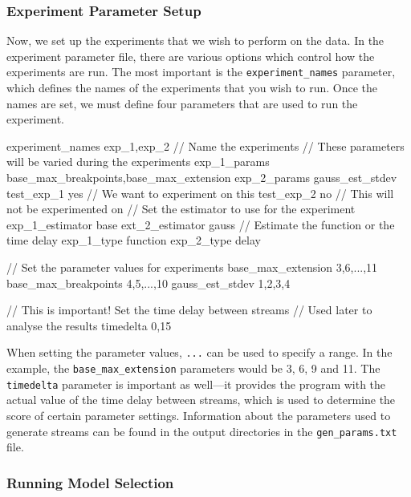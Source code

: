 \documentclass[a4paper,11pt,twoside]{article}
\begin{document}
\begin{appendices}
\subsubsection{Experiment Parameter Setup}
\label{sec-10-3-3}

    Now, we set up the experiments that we wish to perform on the data. In the
    experiment parameter file, there are various options which control how the
    experiments are run. The most important is the \texttt{experiment\_names}
    parameter, which defines the names of the experiments that you wish to run. Once
    the names are set, we must define four parameters that are used to run the experiment.
    \small
    \begin{verbatimtab}
    experiment_names exp_1,exp_2 // Name the experiments
    // These parameters will be varied during the experiments
    exp_1_params base_max_breakpoints,base_max_extension
    exp_2_params gauss_est_stdev
    test_exp_1 yes // We want to experiment on this
    test_exp_2 no // This will not be experimented on
    // Set the estimator to use for the experiment
    exp_1_estimator base 
    ext_2_estimator gauss
    // Estimate the function or the time delay
    exp_1_type function
    exp_2_type delay

    // Set the parameter values for experiments
    base_max_extension 3,6,...,11
    base_max_breakpoints 4,5,...,10
    gauss_est_stdev 1,2,3,4

    // This is important! Set the time delay between streams
    // Used later to analyse the results
    timedelta 0,15
    \end{verbatimtab}
    \normalsize

    When setting the parameter values, \texttt{...} can be used to specify a
    range. In the example, the \texttt{base\_max\_extension} parameters would be 3,
    6, 9 and 11. The \texttt{timedelta} parameter is important as well---it provides
    the program with the actual value of the time delay between streams, which is
    used to determine the score of certain parameter settings. Information about the
    parameters used to generate streams can be found in the output directories in
    the \texttt{gen\_params.txt} file.
\subsubsection{Running Model Selection}
\label{sec-10-3-4}


\end{appendices}
\end{document}
